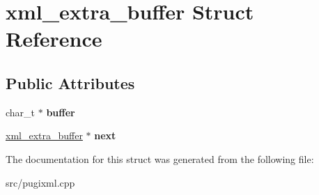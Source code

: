 \hypertarget{structxml__extra__buffer}{}\section{xml\+\_\+extra\+\_\+buffer Struct Reference}
\label{structxml__extra__buffer}
\subsection*{Public Attributes}
\begin{DoxyCompactItemize}
\item 
\mbox{\label{structxml__extra__buffer_ab24b191b25f92ad4d48009978ebee38c}} 
char\+\_\+t $\ast$ {\bfseries buffer}
\item 
\mbox{\label{structxml__extra__buffer_a8aaafa90868ca4d8e06b21eeabd96183}} 
\hyperlink{structxml__extra__buffer}{xml\+\_\+extra\+\_\+buffer} $\ast$ {\bfseries next}
\end{DoxyCompactItemize}


The documentation for this struct was generated from the following file\+:\begin{DoxyCompactItemize}
\item 
src/pugixml.\+cpp\end{DoxyCompactItemize}
